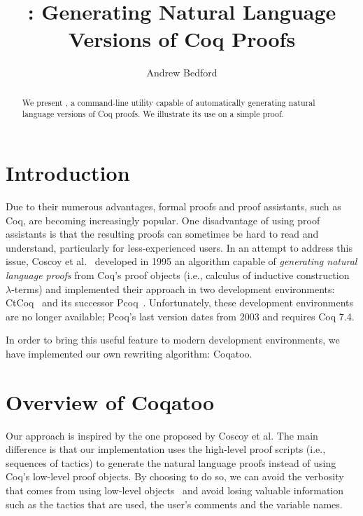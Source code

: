 \documentclass[sigplan,9pt]{acmart}\settopmatter{printfolios=true,printccs=false,printacmref=false}
\begin{document}
\title[Coqatoo]{\coqatoo: Generating Natural Language Versions of Coq Proofs}


\author{Andrew Bedford}


\begin{abstract}
  We present \coqatoo, a command-line utility capable of automatically generating natural language versions of Coq proofs. We illustrate its use on a simple proof.
\end{abstract}

\maketitle

\section{Introduction}
Due to their numerous advantages, formal proofs and proof assistants, such as Coq, are becoming increasingly popular. One disadvantage of using proof assistants is that the resulting proofs can sometimes be hard to read and understand, particularly for less-experienced users. In an attempt to address this issue, Coscoy et al.~\cite{DBLP:conf/tlca/CoscoyKT95} developed in 1995 an algorithm capable of \emph{generating natural language proofs} from Coq's proof objects (i.e., calculus of inductive construction $\lambda$-terms) and implemented their approach in two development environments: CtCoq~\cite{CtCoq} and its successor Pcoq~\cite{Pcoq}. Unfortunately, these development environments are no longer available; Pcoq's last version dates from 2003 and requires Coq 7.4.

In order to bring this useful feature to modern development environments, we have implemented our own rewriting algorithm: Coqatoo.


\section{Overview of Coqatoo}
Our approach is inspired by the one proposed by Coscoy et al. The main difference is that our implementation uses the high-level proof scripts (i.e., sequences of tactics) to generate the natural language proofs instead of using Coq's low-level proof objects. By choosing to do so, we can avoid the verbosity that comes from using low-level objects~\cite{DBLP:conf/lacl/Coscoy96} and avoid losing valuable information such as the tactics that are used, the user's comments and the variable names. 
\end{document}
